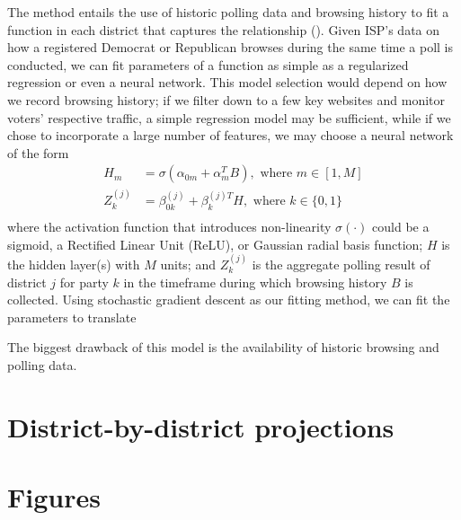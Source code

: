 \documentclass[12pt, letterpaper]{article}
\begin{document}
The method entails the use of historic polling data and browsing history to fit a function in each district that captures the relationship (). Given ISP's data on how a registered Democrat or Republican browses during the same time a poll is conducted, we can fit parameters of a function as simple as a regularized regression or even a neural network. This model selection would depend on how we record browsing history; if we filter down to a few key websites and monitor voters' respective traffic, a simple regression model may be sufficient, while if we chose to incorporate a large number of features, we may choose a neural network of the form
\begin{align*}
H_m &= \sigma(\alpha_{0m} + \alpha_m^TB), \text{\ where \ } m \in [1,M]\\
Z_{k}^{(j)} &= \beta_{0k}^{(j)} + \beta_k^{(j)T}H, \text{\ where \ } k \in \{0, 1\}\\
\end{align*}
where the activation function that introduces non-linearity $\sigma(\cdot)$ could be a sigmoid, a Rectified Linear Unit (ReLU), or Gaussian radial basis function; $H$ is the hidden layer(s) with $M$ units; and $Z_k^{(j)}$ is the aggregate polling result of district $j$ for party $k$ in the timeframe during which browsing history $B$ is collected. Using stochastic gradient descent as our fitting method, we can fit the parameters to translate 

The biggest drawback of this model is the availability of historic browsing and polling data.




\newpage
\appendix

\section{District-by-district projections}
\label{sec:district_results}


\section{Figures}
\label{sec:figures}
\end{document}
